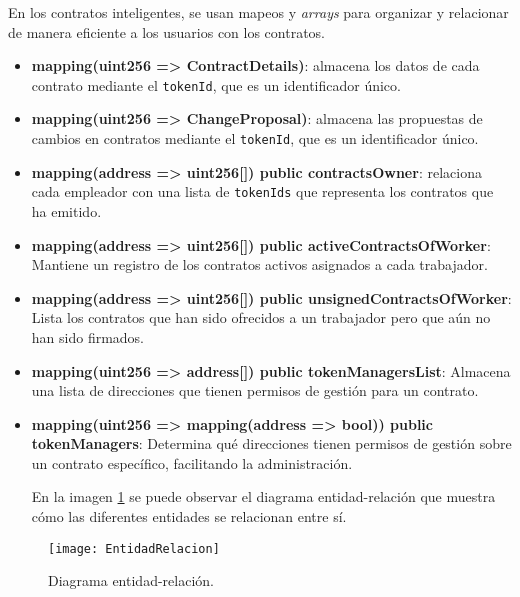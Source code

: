 En los contratos inteligentes, se usan mapeos y \textit{arrays} para organizar y relacionar de manera eficiente a los usuarios con los contratos.

\begin{itemize}

\item \textbf{mapping(uint256 => ContractDetails)}: almacena los datos de cada contrato mediante el \texttt{tokenId}, que es un identificador único.

\item \textbf{mapping(uint256 => ChangeProposal)}: almacena las propuestas de cambios en contratos mediante el \texttt{tokenId}, que es un identificador único.

\item \textbf{mapping(address => uint256[]) public contractsOwner}: relaciona cada empleador con una lista de \texttt{tokenIds} que representa los contratos que ha emitido.

\item \textbf{mapping(address => uint256[]) public activeContractsOfWorker}: Mantiene un registro de los contratos activos asignados a cada trabajador.

\item \textbf{mapping(address => uint256[]) public unsignedContractsOfWorker}: Lista los contratos que han sido ofrecidos a un trabajador pero que aún no han sido firmados.

\item \textbf{mapping(uint256 => address[]) public tokenManagersList}: Almacena una lista de direcciones que tienen permisos de gestión para un contrato.

\item \textbf{mapping(uint256 => mapping(address => bool)) public tokenManagers}: Determina qué direcciones tienen permisos de gestión sobre un contrato específico, facilitando la administración.

En la imagen \ref{fig:EntidadRelacion} se puede observar el diagrama entidad-relación que muestra cómo las diferentes entidades se relacionan entre sí. 

\end{itemize}

\begin{figure}[h]
	\centering
	\texttt{[image: EntidadRelacion]}
	\caption[Diagrama entidad-relación]{Diagrama entidad-relación.}
	\label{fig:EntidadRelacion}
\end{figure}


